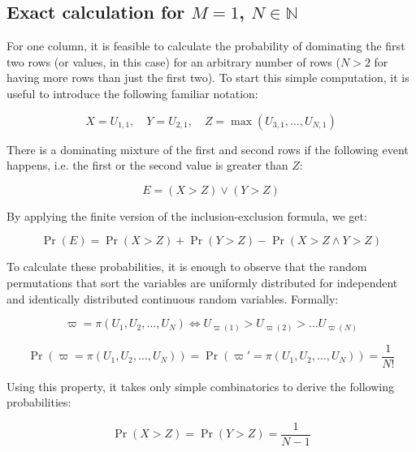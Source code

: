 \documentclass{article}
\theoremstyle{definition}
\begin{document}
\begin{appendices}
\section{Exact calculation for $M=1$, $N \in \mathbb{N}$}

For one column, it is feasible to calculate the probability of dominating the first two rows (or values, in this case) for an arbitrary number of rows ($N>2$ for having more rows than just the first two).
To start this simple computation, it is useful to introduce the following familiar notation:

\begin{equation}
    X = U_{1,1}, \quad Y = U_{2,1}, \quad Z = \max(U_{3,1},\dots,U_{N,1})
\end{equation}

There is a dominating mixture of the first and second rows if the following event happens, i.e. the first or the second value is greater than $Z$:

\begin{equation}
    E = (X > Z) \vee (Y>Z)
\end{equation}

By applying the finite version of the inclusion-exclusion formula, we get:

\begin{equation}
    \Pr(E) = \Pr(X>Z) + \Pr(Y>Z) - \Pr(X>Z \wedge Y>Z)
\end{equation}

To calculate these probabilities, it is enough to observe that the random permutations that sort the variables are uniformly distributed for independent and identically distributed continuous random variables. Formally:

\begin{equation}
    \varpi = \pi(U_1,U_2,\dots,U_N)
    \iff
    U_{\varpi(1)} > U_{\varpi(2)} > \dots U_{\varpi(N)}
\end{equation}

\begin{equation}
    \Pr(\varpi = \pi(U_1,U_2,\dots,U_N)) = \Pr(\varpi' = \pi(U_1,U_2,\dots,U_N)) = \frac{1}{N!}
\end{equation}

Using this property, it takes only simple combinatorics to derive the following probabilities:

\begin{equation}
    \Pr(X>Z) = \Pr(Y>Z) = \frac{1}{N-1}
\end{equation}


\end{appendices}
\end{document}
